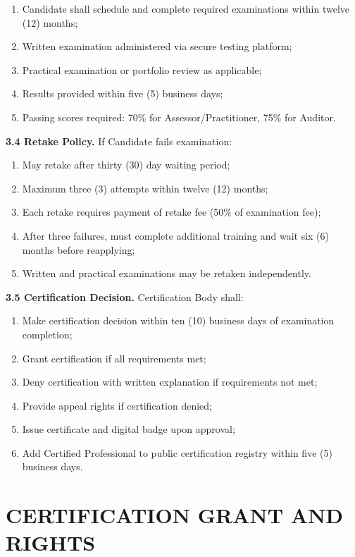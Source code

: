 \documentclass[11pt,a4paper]{article}
\begin{document}
\begin{enumerate}[label=\alph*)]
\item Candidate shall schedule and complete required examinations within twelve (12) months;
\item Written examination administered via secure testing platform;
\item Practical examination or portfolio review as applicable;
\item Results provided within five (5) business days;
\item Passing scores required: 70\% for Assessor/Practitioner, 75\% for Auditor.
\end{enumerate}

\textbf{3.4 Retake Policy.} If Candidate fails examination:

\begin{enumerate}[label=\alph*)]
\item May retake after thirty (30) day waiting period;
\item Maximum three (3) attempts within twelve (12) months;
\item Each retake requires payment of retake fee (50\% of examination fee);
\item After three failures, must complete additional training and wait six (6) months before reapplying;
\item Written and practical examinations may be retaken independently.
\end{enumerate}

\textbf{3.5 Certification Decision.} Certification Body shall:

\begin{enumerate}[label=\alph*)]
\item Make certification decision within ten (10) business days of examination completion;
\item Grant certification if all requirements met;
\item Deny certification with written explanation if requirements not met;
\item Provide appeal rights if certification denied;
\item Issue certificate and digital badge upon approval;
\item Add Certified Professional to public certification registry within five (5) business days.
\end{enumerate}

\section{CERTIFICATION GRANT AND RIGHTS}
\end{document}
